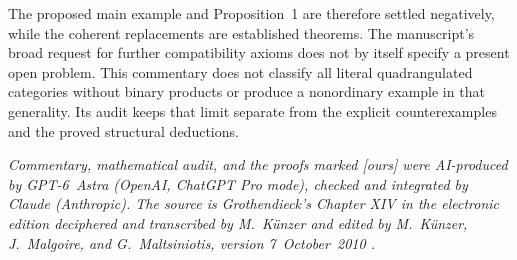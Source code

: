 The proposed main example and Proposition~1 are therefore settled negatively, while the coherent replacements are established theorems. The manuscript's broad request for further compatibility axioms does not by itself specify a present open problem. This commentary does not classify all literal quadrangulated categories without binary products or produce a nonordinary example in that generality. Its audit keeps that limit separate from the explicit counterexamples and the proved structural deductions.

\medskip
\noindent\emph{Commentary, mathematical audit, and the proofs marked \textup{[ours]} were AI-produced by \mbox{GPT-6 Astra} (OpenAI, ChatGPT Pro mode), checked and integrated by Claude (Anthropic). The source is Grothendieck's Chapter XIV in the electronic edition deciphered and transcribed by M.~K\"unzer and edited by M.~K\"unzer, J.~Malgoire, and G.~Maltsiniotis, version 7~October~2010 \citep{Grothendieck1990XIV}.}\par

